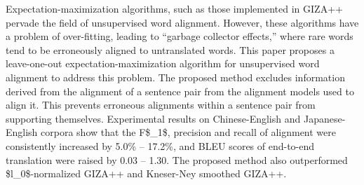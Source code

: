 Expectation-maximization algorithms, such as those implemented in GIZA++ pervade the field of unsupervised word alignment. However, these algorithms have a problem of over-fitting, leading to ``garbage collector effects,'' where rare words tend to be erroneously aligned to untranslated words. This paper proposes a leave-one-out expectation-maximization algorithm for unsupervised word alignment to address this problem. The proposed method excludes information derived from the alignment of a sentence pair from the alignment models used to align it. This prevents erroneous alignments within a sentence pair from supporting themselves. Experimental results on Chinese-English and Japanese-English corpora show that the F\$\_1\$, precision and recall of alignment were consistently increased by 5.0\% -- 17.2\%, and BLEU scores of end-to-end translation were raised by 0.03 -- 1.30.  The proposed method also outperformed \$l\_0\$-normalized GIZA++ and Kneser-Ney smoothed GIZA++.

